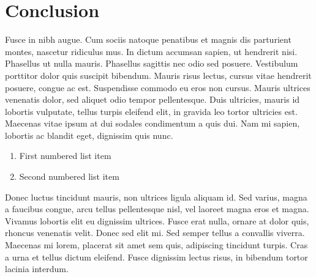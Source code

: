 \documentclass[a4paper,11pt]{article}
\begin{document}

\section*{Conclusion}

Fusce in nibh augue. Cum sociis natoque penatibus et magnis dis parturient montes, nascetur ridiculus mus. In dictum accumsan sapien, ut hendrerit nisi. Phasellus ut nulla mauris. Phasellus sagittis nec odio sed posuere. Vestibulum porttitor dolor quis suscipit bibendum. Mauris risus lectus, cursus vitae hendrerit posuere, congue ac est. Suspendisse commodo eu eros non cursus. Mauris ultrices venenatis dolor, sed aliquet odio tempor pellentesque. Duis ultricies, mauris id lobortis vulputate, tellus turpis eleifend elit, in gravida leo tortor ultricies est. Maecenas vitae ipsum at dui sodales condimentum a quis dui. Nam mi sapien, lobortis ac blandit eget, dignissim quis nunc.

\begin{enumerate}
\item First numbered list item
\item Second numbered list item
\end{enumerate}

Donec luctus tincidunt mauris, non ultrices ligula aliquam id. Sed varius, magna a faucibus congue, arcu tellus pellentesque nisl, vel laoreet magna eros et magna. Vivamus lobortis elit eu dignissim ultrices. Fusce erat nulla, ornare at dolor quis, rhoncus venenatis velit. Donec sed elit mi. Sed semper tellus a convallis viverra. Maecenas mi lorem, placerat sit amet sem quis, adipiscing tincidunt turpis. Cras a urna et tellus dictum eleifend. Fusce dignissim lectus risus, in bibendum tortor lacinia interdum.






\end{document}
